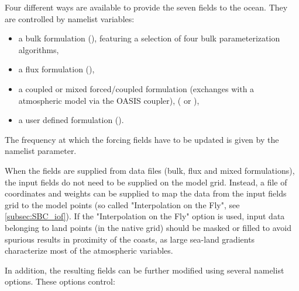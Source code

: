 \documentclass[../main/NEMO_manual]{subfiles}
\begin{document}
Four different ways are available to provide the seven fields to the ocean. They are controlled by
namelist  variables:

\begin{itemize}
\item a bulk formulation (), featuring a selection of four bulk parameterization algorithms,
\item a flux formulation (),
\item a coupled or mixed forced/coupled formulation (exchanges with a atmospheric model via the OASIS coupler),
( or ),
\item a user defined formulation ().
\end{itemize}

The frequency at which the forcing fields have to be updated is given by the  namelist parameter.

When the fields are supplied from data files (bulk, flux and mixed formulations),
the input fields do not need to be supplied on the model grid.
Instead, a file of coordinates and weights can be supplied to map the data from the input fields grid to
the model points (so called "Interpolation on the Fly", see \autoref{subsec:SBC_iof}).
If the "Interpolation on the Fly" option is used, input data belonging to land points (in the native grid)
should be masked or filled to avoid spurious results in proximity of the coasts, as
large sea-land gradients characterize most of the atmospheric variables.

In addition, the resulting fields can be further modified using several namelist options.
These options control:
\end{document}
